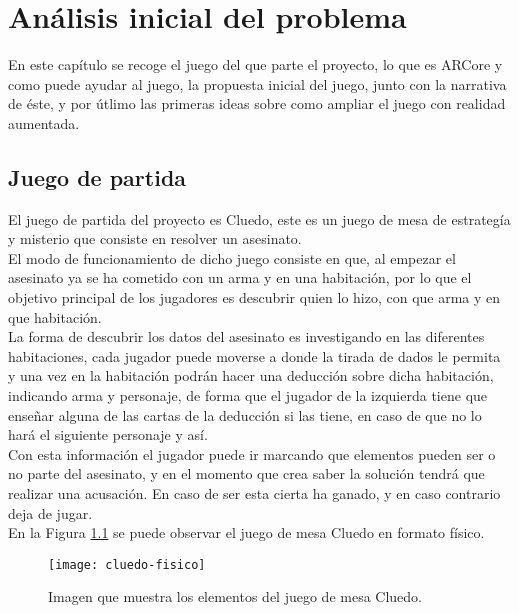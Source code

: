 \chapter{Análisis inicial del problema}
\label{ch:analisis}
En este capítulo se recoge el juego del que parte el proyecto, lo que es ARCore y como puede ayudar al juego, la propuesta inicial del juego, junto con la narrativa de éste, y por útlimo las primeras ideas sobre como ampliar el juego con realidad aumentada.

\section{Juego de partida}
El juego de partida del proyecto es Cluedo, este es un juego de mesa de estrategía y misterio que consiste en resolver un asesinato.\\

El modo de funcionamiento de dicho juego consiste en que, al empezar el asesinato ya se ha cometido con un arma y en una habitación, por lo que el objetivo principal de los jugadores es descubrir quien lo hizo, con que arma y en que habitación.\\

La forma de descubrir los datos del asesinato es investigando en las diferentes habitaciones, cada jugador puede moverse a donde la tirada de dados le permita y una vez en la habitación podrán hacer una deducción sobre dicha habitación, indicando arma y personaje, de forma que el jugador de la izquierda tiene que enseñar alguna de las cartas de la deducción si las tiene, en caso de que no lo hará el siguiente personaje y así.\\

Con esta información el jugador puede ir marcando que elementos pueden ser o no parte del asesinato, y en el momento que crea saber la solución tendrá que realizar una acusación. En caso de ser esta cierta ha ganado, y en caso contrario deja de jugar.\\

En la Figura \ref{figura-cluedo-fisico} se puede observar el juego de mesa Cluedo en formato físico.

\begin{figure}[h]
  \centering
  \texttt{[image: cluedo-fisico]}
  \caption{Imagen que muestra los elementos del juego de mesa Cluedo.\protect\footnotemark}
  \label{figura-cluedo-fisico}
\end{figure}


